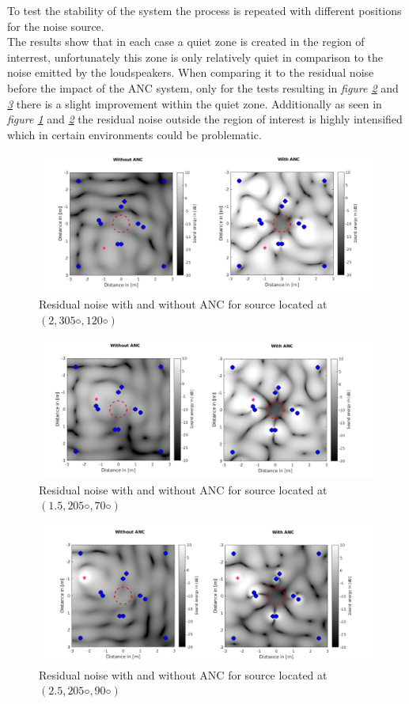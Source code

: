 To test the stability of the system the process is repeated with different positions for the noise source.\\
The results show that in each case a quiet zone is created in the region of interrest, unfortunately this zone is only relatively quiet in comparison to the noise emitted by the loudspeakers. When comparing it to the residual noise before the impact of the ANC system, only for the tests resulting in \textit{figure \ref{fig:ANC3}} and \textit{\ref{fig:ANC4}} there is a slight improvement within the quiet zone. Additionally as seen in \textit{figure \ref{fig:ANC2}} and \textit{\ref{fig:ANC3}} the residual noise outside the region of interest is highly intensified which in certain environments could be problematic.
\begin{figure}[H]
    \centerline{\includegraphics[width=180mm,keepaspectratio]{LaTeX/images/plots/ANC_2_both.png}}
    \caption{Residual noise with and without ANC for source located at $(2, 305◦ , 120◦)$}
    \label{fig:ANC2}
\end{figure}
\begin{figure}[H]
    \centerline{\includegraphics[width=180mm,keepaspectratio]{LaTeX/images/plots/ANC_3_both.png}}
    \caption{Residual noise with and without ANC for source located at $(1.5, 205◦ , 70◦)$}
    \label{fig:ANC3}
\end{figure}
\begin{figure}[H]
    \centerline{\includegraphics[width=180mm,keepaspectratio]{LaTeX/images/plots/ANC_4_both.png}}
    \caption{Residual noise with and without ANC for source located at $(2.5, 205◦ , 90◦)$}
    \label{fig:ANC4}
\end{figure}

